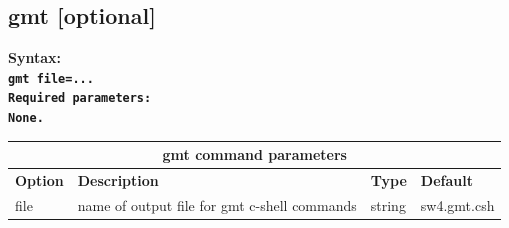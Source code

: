 \documentclass[11pt]{report}
\begin{document}
\subsection{gmt [optional]}
\label{keyword:gmt}
\begin{flushleft}\bf
Syntax:\\
\tt gmt file=...\\
\bf Required parameters:\\
\rm None.
\end{flushleft}
%
\begin{center}
\begin{tabular}{|l|p{8cm}|l|l|} \hline
\multicolumn{4}{|c|}{\bf gmt command parameters}\\ \hline
\bf{Option} & \bf{Description} & \bf{Type} & \bf{Default} \\ \hline \hline
file & name of output file for gmt c-shell commands & string & sw4.gmt.csh  \\ \hline
\end{tabular}
\end{center}


\end{document}
